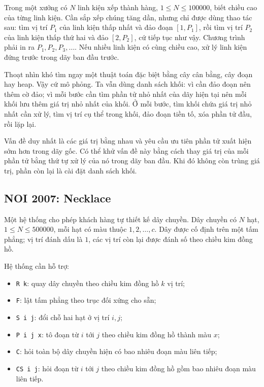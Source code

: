 \documentclass[11pt]{article}
\begin{document}
Trong một xưởng có \(N\) linh kiện xếp thành hàng, \(1\le N\le 100000\), biết
chiều cao của từng linh kiện. Cần sắp xếp chúng tăng dần, nhưng chỉ được dùng
thao tác sau: tìm vị trí \(P_1\) của linh kiện thấp nhất và đảo đoạn
\([1,P_1]\), rồi tìm vị trí \(P_2\) của linh kiện thấp thứ hai và đảo
\([2,P_2]\), cứ tiếp tục như vậy. Chương trình phải in ra \(P_1,P_2,P_3,\ldots\).
Nếu nhiều linh kiện có cùng chiều cao, xử lý linh kiện đứng trước trong dãy
ban đầu trước.

Thoạt nhìn khó tìm ngay một thuật toán đặc biệt bằng cây cân bằng, cây đoạn
hay heap. Vậy cứ mô phỏng. Ta vẫn dùng danh sách khối: vì cần đảo đoạn nên
thêm cờ đảo; vì mỗi bước cần tìm phần tử nhỏ nhất của dãy hiện tại nên mỗi
khối lưu thêm giá trị nhỏ nhất của khối. Ở mỗi bước, tìm khối chứa giá trị
nhỏ nhất cần xử lý, tìm vị trí cụ thể trong khối, đảo đoạn tiền tố, xóa phần
tử đầu, rồi lặp lại.

Vấn đề duy nhất là các giá trị bằng nhau và yêu cầu ưu tiên phần tử xuất hiện
sớm hơn trong dãy gốc. Có thể khử vấn đề này bằng cách thay giá trị của mỗi
phần tử bằng thứ tự xử lý của nó trong dãy ban đầu. Khi đó không còn trùng
giá trị, phần còn lại là cài đặt danh sách khối.

\subsection{NOI 2007: Necklace}

Một hệ thống cho phép khách hàng tự thiết kế dây chuyền. Dây chuyền có
\(N\) hạt, \(1\le N\le 500000\), mỗi hạt có màu thuộc \(1,2,\ldots,c\). Dây
được cố định trên một tấm phẳng; vị trí đánh dấu là \(1\), các vị trí còn lại
được đánh số theo chiều kim đồng hồ.

Hệ thống cần hỗ trợ:
\begin{itemize}
  \item \texttt{R k}: quay dây chuyền theo chiều kim đồng hồ \(k\) vị trí;
  \item \texttt{F}: lật tấm phẳng theo trục đối xứng cho sẵn;
  \item \texttt{S i j}: đổi chỗ hai hạt ở vị trí \(i,j\);
  \item \texttt{P i j x}: tô đoạn từ \(i\) tới \(j\) theo chiều kim đồng hồ
  thành màu \(x\);
  \item \texttt{C}: hỏi toàn bộ dây chuyền hiện có bao nhiêu đoạn màu liên
  tiếp;
  \item \texttt{CS i j}: hỏi đoạn từ \(i\) tới \(j\) theo chiều kim đồng hồ
  gồm bao nhiêu đoạn màu liên tiếp.
\end{itemize}
\end{document}
